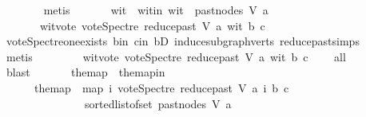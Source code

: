 \begin{isabellebody}
\ \ \ \ \ \ \isamarkupfalse%
\ metis\ \isanewline
\ \ \ \ \isamarkupfalse%
\ wit\ \ wit{\isacharunderscore}{\kern0pt}in{\isacharcolon}{\kern0pt}\ {\isachardoublequoteopen}wit\ {\isasymin}\ past{\isacharunderscore}{\kern0pt}nodes\ V\ a{\isachardoublequoteclose}\ \isanewline
\ \ \ \ \ \ \ wit{\isacharunderscore}{\kern0pt}vote{\isacharcolon}{\kern0pt}\ {\isachardoublequoteopen}vote{\isacharunderscore}{\kern0pt}Spectre\ {\isacharparenleft}{\kern0pt}reduce{\isacharunderscore}{\kern0pt}past\ V\ a{\isacharparenright}{\kern0pt}\ wit\ b\ c\ {\isasymnoteq}\ {}{\isachardoublequoteclose}\isanewline
\ \ \ \ \ \ \isamarkupfalse%
\ vote{\isacharunderscore}{\kern0pt}Spectre{\isacharunderscore}{\kern0pt}one{\isacharunderscore}{\kern0pt}exists\ b{\isacharunderscore}{\kern0pt}in{}\ c{\isacharunderscore}{\kern0pt}in{}\ bD\ induce{\isacharunderscore}{\kern0pt}subgraph{\isacharunderscore}{\kern0pt}verts\ reduce{\isacharunderscore}{\kern0pt}past{\isachardot}{\kern0pt}simps\isanewline
\ \ \ \ \ \ \isamarkupfalse%
\ metis\ \isanewline
\ \ \ \ \isamarkupfalse%
\ \isamarkupfalse%
\ wit{\isacharunderscore}{\kern0pt}vote{}{\isacharcolon}{\kern0pt}\ {\isachardoublequoteopen}vote{\isacharunderscore}{\kern0pt}Spectre\ {\isacharparenleft}{\kern0pt}reduce{\isacharunderscore}{\kern0pt}past\ V\ a{\isacharparenright}{\kern0pt}\ wit\ b\ c\ {\isacharequal}{\kern0pt}\ {}{\isachardoublequoteclose}\ \isamarkupfalse%
\ all{}{}\isanewline
\ \ \ \ \ \ \isamarkupfalse%
\ blast\ \isanewline
\ \ \ \ \isamarkupfalse%
\ the{\isacharunderscore}{\kern0pt}map\ \ the{\isacharunderscore}{\kern0pt}map{\isacharunderscore}{\kern0pt}in{\isacharcolon}{\kern0pt}\ \isanewline
\ \ \ \ \ \ {\isachardoublequoteopen}the{\isacharunderscore}{\kern0pt}map\ {\isacharequal}{\kern0pt}\ {\isacharparenleft}{\kern0pt}map\ {\isacharparenleft}{\kern0pt}{\isasymlambda}i{\isachardot}{\kern0pt}\ vote{\isacharunderscore}{\kern0pt}Spectre\ {\isacharparenleft}{\kern0pt}reduce{\isacharunderscore}{\kern0pt}past\ V\ a{\isacharparenright}{\kern0pt}\ i\ b\ c{\isacharparenright}{\kern0pt}\ \isanewline
\ \ \ \ \ \ \ \ \ \ \ \ \ \ \ {\isacharparenleft}{\kern0pt}sorted{\isacharunderscore}{\kern0pt}list{\isacharunderscore}{\kern0pt}of{\isacharunderscore}{\kern0pt}set\ {\isacharparenleft}{\kern0pt}past{\isacharunderscore}{\kern0pt}nodes\ V\ a{\isacharparenright}{\kern0pt}{\isacharparenright}{\kern0pt}{\isacharparenright}{\kern0pt}{\isachardoublequoteclose}\isanewline

\end{isabellebody}
